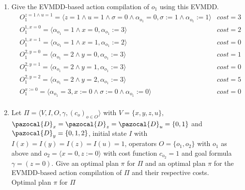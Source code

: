 \documentclass[11pt,a4paper]{article}
\begin{document}
\begin{enumerate}[label=\alph*)]
	\item Give the EVMDD-based action compilation of $o_1$ using this EVMDD.
	\begin{align*}
		&O_1^{z=1 \land u=1} = \langle z = 1 \land u = 1 \land \sigma = 0 \land \alpha_{o_1} = 0, \sigma := 1 \land \alpha_{o_1} := 1\rangle & cost=3&\\
		&O_1^{1, x=0} = \langle \alpha_{o_1} = 1 \land x = 0, \alpha_{o_1} := 3 \rangle & cost = 2&\\
		&O_1^{1, x=1} = \langle \alpha_{o_1} = 1 \land x = 1, \alpha_{o_1} := 2 \rangle & cost = 0&\\
		&O_1^{2, y=0} = \langle \alpha_{o_1} = 2 \land y = 0, \alpha_{o_1} := 3 \rangle & cost = 1&\\
		&O_1^{2, y=1} = \langle \alpha_{o_1} = 2 \land y = 1, \alpha_{o_1} := 3 \rangle & cost = 0&\\
		&O_1^{2, y=2} = \langle \alpha_{o_1} = 2 \land y = 2, \alpha_{o_1} := 3 \rangle & cost = 5&\\
		&O_1^{x:=0} = \langle \alpha_{o_1} = 3, x := 0 \land \sigma := 0 \land \alpha_{o_1} := 0 \rangle & cost = 0&\\
	\end{align*}
	\item Let $\Pi = \langle V, I, O, \gamma, (c_o)_{o \in O} \rangle$ with $V = \{x, y, z, u\}$, $\pazocal{D}_x =\pazocal{D}_z = \pazocal{D}_u = \{0, 1\}$ and $\pazocal{D}_y = \{0, 1, 2\}$, initial state $I$ with $I(x) = I(y) = I(z) = I(u) = 1$, operators $O = \{o_1, o_2\}$ with $o_1$ as above and $o_2 = \langle x = 0, z := 0\rangle$ with cost function $c_{o_2} = 1$ and goal formula $\gamma = (z = 0)$. Give an optimal plan $\pi$ for $\Pi$ and an optimal plan $\pi$ for the EVMDD-based action compilation of $\Pi$ and their respective costs.\\
	Optimal plan $\pi$ for $\Pi$\\
\end{enumerate}
\end{document}
